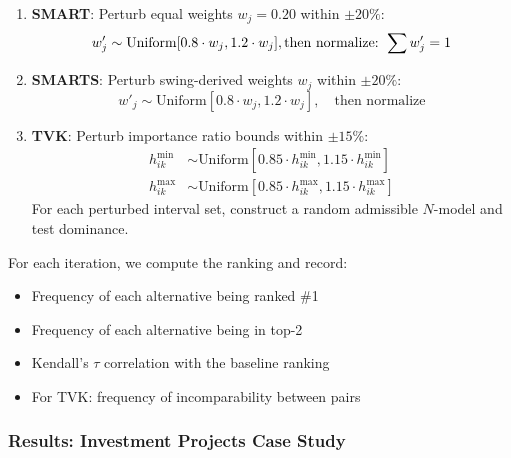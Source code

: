\documentclass[conference]{IEEEtran}
\begin{document}
\begin{enumerate}
	\item \textbf{SMART}: Perturb equal weights $w_j = 0.20$ within $\pm 20\%$:
	\begin{equation}
		w'_j \sim \text{Uniform}[0.8 \cdot w_j, 1.2 \cdot w_j], \quad
		\\ \text{then normalize: } \sum w'_j = 1
	\end{equation}
	
	\item \textbf{SMARTS}: Perturb swing-derived weights $w_j$ within $\pm 20\%$:
	\begin{equation}
		w'_j \sim \text{Uniform}[0.8 \cdot w_j, 1.2 \cdot w_j], \quad \text{then normalize}
	\end{equation}
	
	\item \textbf{TVK}: Perturb importance ratio bounds within $\pm 15\%$:
	\begin{align}
		h^{\min}_{ik} &\sim \text{Uniform}[0.85 \cdot h^{\min}_{ik}, 1.15 \cdot h^{\min}_{ik}] \\
		h^{\max}_{ik} &\sim \text{Uniform}[0.85 \cdot h^{\max}_{ik}, 1.15 \cdot h^{\max}_{ik}]
	\end{align}
	For each perturbed interval set, construct a random admissible $N$-model and test dominance.
\end{enumerate}
For each iteration, we compute the ranking and record:
\begin{itemize}
	\item Frequency of each alternative being ranked \#1
	\item Frequency of each alternative being in top-2
	\item Kendall's $\tau$ correlation with the baseline ranking
	\item For TVK: frequency of incomparability between pairs
\end{itemize}

\subsubsection{Results: Investment Projects Case Study}
\end{document}

